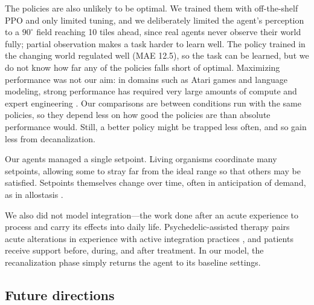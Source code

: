 \documentclass[12pt,fleqn]{article}
\begin{document}
The policies are also unlikely to be optimal. We trained them with off-the-shelf PPO and only limited tuning, and we deliberately limited the agent's perception to a $90^\circ$ field reaching 10 tiles ahead, since real agents never observe their world fully; partial observation makes a task harder to learn well. The policy trained in the changing world regulated well (MAE 12.5), so the task can be learned, but we do not know how far any of the policies falls short of optimal. Maximizing performance was not our aim: in domains such as Atari games and language modeling, strong performance has required very large amounts of compute and expert engineering \citep{mnih_human-level_2015, badia_agent57_2020, hoffmann_training_2022}. Our comparisons are between conditions run with the same policies, so they depend less on how good the policies are than absolute performance would. Still, a better policy might be trapped less often, and so gain less from decanalization.

Our agents managed a single setpoint. Living organisms coordinate many setpoints, allowing some to stray far from the ideal range so that others may be satisfied. Setpoints themselves change over time, often in anticipation of demand, as in allostasis \citep{sterling_allostasis_1988}. 

We also did not model integration---the work done after an acute experience to process and carry its effects into daily life. Psychedelic-assisted therapy pairs acute alterations in experience with active integration practices \citep{bathje_psychedelic_2022}, and patients receive support before, during, and after treatment. In our model, the recanalization phase simply returns the agent to its baseline settings. 

\subsection{Future directions}
\end{document}
